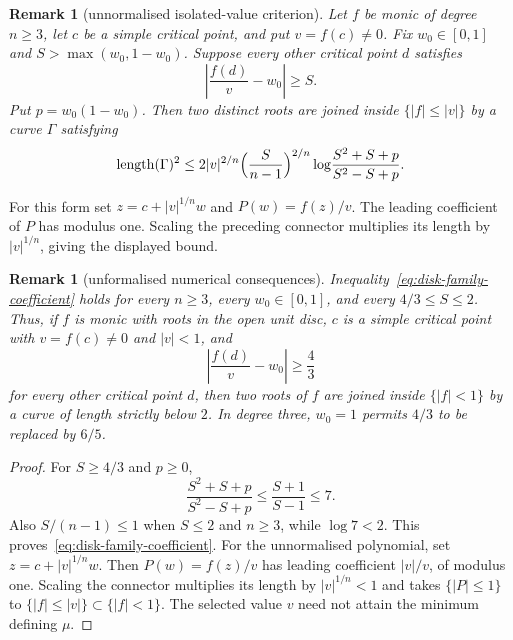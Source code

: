 \documentclass[11pt]{article}
\newtheorem{remark}[theorem]{Remark}
\begin{document}
\begin{remark}[unnormalised isolated-value criterion]
\label{res:critical-value-separation-unnormalised}
Let $f$ be monic of degree $n\ge3$, let $c$ be a simple critical point, and
put $v=f(c)\ne0$.  Fix $w_0\in[0,1]$ and
$S>\max(w_0,1-w_0)$.  Suppose every other critical point $d$ satisfies
\[
  \left|\frac{f(d)}v-w_0\right|\ge S .
\]
Put $p=w_0(1-w_0)$.  Then two distinct roots are joined inside
$\{|f|\le|v|\}$ by a curve $\Gamma$ satisfying
\begin{equation}\label{eq:disk-family-unnormalised-length}
 \operatorname{length}(\Gamma)^2
 \le 2|v|^{2/n}\Bigl(\frac{S}{n-1}\Bigr)^{2/n}
 \log\!\frac{S^2+S+p}{S^2-S+p}.
\end{equation}
\end{remark}
For this form set $z=c+|v|^{1/n}w$ and $P(w)=f(z)/v$.
The leading coefficient of $P$ has modulus one. Scaling the preceding
connector multiplies its length by $|v|^{1/n}$, giving the displayed bound.

\begin{remark}[unformalised numerical consequences]
\label{res:critical-value-thresholds}
Inequality~\eqref{eq:disk-family-coefficient} holds for every $n\ge3$,
every $w_0\in[0,1]$, and every $4/3\le S\le2$.  Thus, if $f$ is monic with
roots in the open unit disc, $c$ is a simple critical point with
$v=f(c)\ne0$ and $|v|<1$, and
\[
 \left|\frac{f(d)}v-w_0\right|\ge\frac43
\]
for every other critical point $d$, then two roots of $f$ are joined inside
$\{|f|<1\}$ by a curve of length strictly below $2$.
In degree three, $w_0=1$ permits $4/3$ to be replaced by $6/5$.
\end{remark}


\begin{proof}
For $S\ge4/3$ and $p\ge0$,
\[
 \frac{S^2+S+p}{S^2-S+p}\le\frac{S+1}{S-1}\le7.
\]
Also $S/(n-1)\le1$ when $S\le2$ and $n\ge3$, while $\log7<2$.
This proves~\eqref{eq:disk-family-coefficient}.  For the unnormalised
polynomial, set $z=c+|v|^{1/n}w$. Then $P(w)=f(z)/v$ has leading
coefficient $|v|/v$, of modulus one. Scaling the connector multiplies its
length by $|v|^{1/n}<1$ and takes $\{|P|\le1\}$ to
$\{|f|\le|v|\}\subset\{|f|<1\}$. The selected value $v$ need not attain
the minimum defining $\mu$.
\end{proof}
\end{document}
